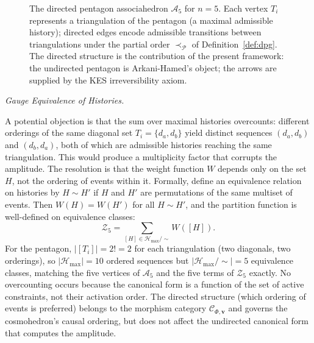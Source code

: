 \documentclass[11pt]{article}
\theoremstyle{plain}
\theoremstyle{definition}
\theoremstyle{remark}
\newcommand{\Ccat}{\mathcal{C}_{\Phi,\mathbf{v}}}
\newcommand{\Hmax}{\mathcal{H}_{\max}}
\begin{document}
\begin{figure}[H]
\centering
{}
\caption{The directed pentagon associahedron $\mathcal{A}_5$ for $n=5$.
Each vertex $T_i$ represents a triangulation of the pentagon (a maximal
admissible history); directed edges encode admissible transitions
between triangulations under the partial order $\prec_{\mathcal{P}}$
of Definition~\ref{def:dpg}. The directed structure is the contribution
of the present framework: the undirected pentagon is Arkani-Hamed's
object; the arrows are supplied by the KES irreversibility axiom.}
\end{figure}

\medskip\noindent\textit{Gauge Equivalence of Histories.}

A potential objection is that the sum over maximal histories overcounts: different orderings of the same diagonal set $T_i = \{d_a, d_b\}$ yield distinct sequences $(d_a, d_b)$ and $(d_b, d_a)$, both of which are admissible histories reaching the same triangulation. This would produce a multiplicity factor that corrupts the amplitude. The resolution is that the weight function $W$ depends only on the set $H$, not the ordering of events within it. Formally, define an equivalence relation on histories by $H \sim H'$ if $H$ and $H'$ are permutations of the same multiset of events. Then $W(H) = W(H')$ for all $H \sim H'$, and the partition function is well-defined on equivalence classes: \[
  \mathcal{Z}_5 = \sum_{[H] \in \Hmax/\!\sim} W([H]).
\]
For the pentagon, $|[T_i]| = 2! = 2$ for each triangulation (two diagonals, two orderings), so $|\Hmax| = 10$ ordered sequences but $|\Hmax/\!\sim| = 5$ equivalence classes, matching the five vertices of $\mathcal{A}_5$ and the five terms of $\mathcal{Z}_5$ exactly. No overcounting occurs because the canonical form is a function of the set of active constraints, not their activation order. The directed structure (which ordering of events is preferred) belongs to the morphism category $\Ccat$ and governs the cosmohedron's causal ordering, but does not affect the undirected canonical form that computes the amplitude.
\end{document}
